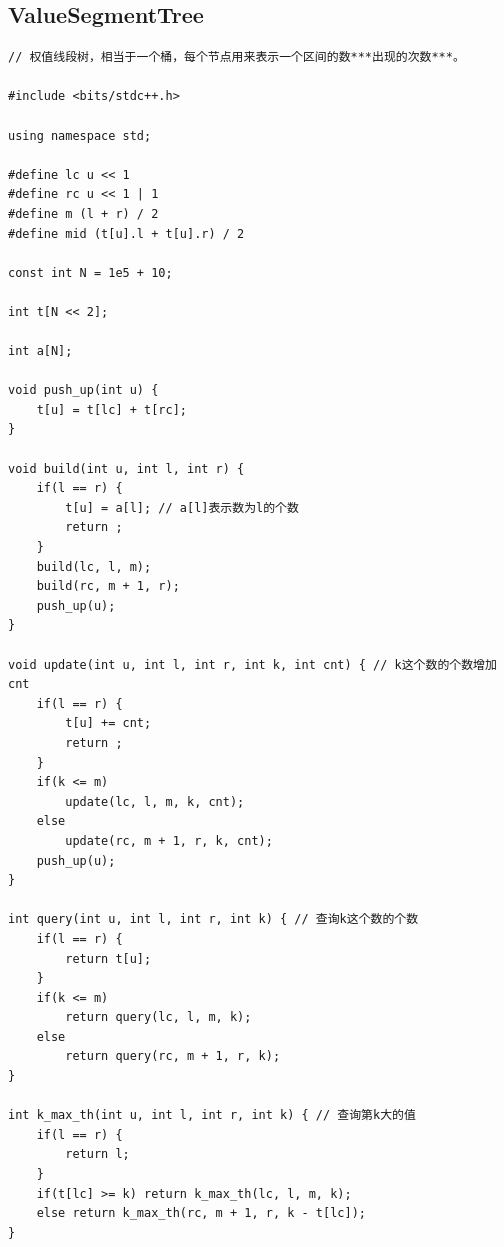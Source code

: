 \documentclass[twoside]{article}
\begin{document}
\subsection{ValueSegmentTree}
\begin{lstlisting}
// 权值线段树，相当于一个桶，每个节点用来表示一个区间的数***出现的次数***。

#include <bits/stdc++.h>

using namespace std;

#define lc u << 1
#define rc u << 1 | 1
#define m (l + r) / 2
#define mid (t[u].l + t[u].r) / 2

const int N = 1e5 + 10;

int t[N << 2];

int a[N];

void push_up(int u) {
    t[u] = t[lc] + t[rc];
}

void build(int u, int l, int r) {
    if(l == r) {
        t[u] = a[l]; // a[l]表示数为l的个数
        return ;
    }
    build(lc, l, m);
    build(rc, m + 1, r);
    push_up(u);
}

void update(int u, int l, int r, int k, int cnt) { // k这个数的个数增加cnt
    if(l == r) {
        t[u] += cnt;
        return ;
    }
    if(k <= m)
        update(lc, l, m, k, cnt);
    else
        update(rc, m + 1, r, k, cnt);
    push_up(u); 
}

int query(int u, int l, int r, int k) { // 查询k这个数的个数
    if(l == r) {
        return t[u];
    }
    if(k <= m)
        return query(lc, l, m, k);
    else 
        return query(rc, m + 1, r, k);
}

int k_max_th(int u, int l, int r, int k) { // 查询第k大的值
    if(l == r) {
        return l;
    }
    if(t[lc] >= k) return k_max_th(lc, l, m, k);
    else return k_max_th(rc, m + 1, r, k - t[lc]);
}
\end{lstlisting}
\end{document}

